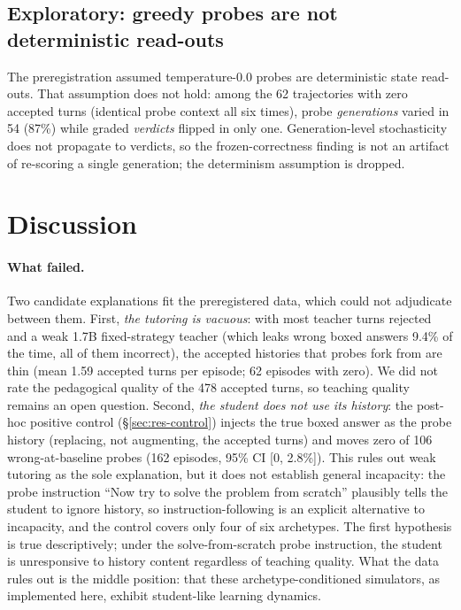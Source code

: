 \documentclass[notitlepage,12pt]{jedm}
\begin{document}
\subsection{Exploratory: greedy probes are not deterministic read-outs}
\label{sec:res-probe}

The preregistration assumed temperature-0.0 probes are deterministic state
read-outs. That assumption does not hold: among the 62 trajectories with
zero accepted turns (identical probe context all six times), probe
\emph{generations} varied in 54 (87\%) while graded \emph{verdicts}
flipped in only one. Generation-level stochasticity does not propagate to
verdicts, so the frozen-correctness finding is not an artifact of
re-scoring a single generation; the determinism assumption is dropped.

\section{Discussion}
\label{sec:discussion}

\paragraph{What failed.} Two candidate explanations fit the preregistered
data, which could not adjudicate between them. First, \emph{the tutoring
is vacuous}: with most teacher turns rejected and a weak 1.7B
fixed-strategy teacher (which leaks wrong boxed answers 9.4\% of the
time, all of them incorrect), the accepted histories that probes fork
from are thin (mean 1.59 accepted turns per episode; 62 episodes with
zero). We did not rate the pedagogical quality of the 478 accepted turns,
so teaching quality remains an open question. Second, \emph{the student
does not use its history}: the post-hoc positive control
(\S\ref{sec:res-control}) injects the true boxed answer as the probe
history (replacing, not augmenting, the accepted turns) and moves zero of
106 wrong-at-baseline probes (162 episodes, 95\% CI [0, 2.8\%]). This rules
out weak tutoring as the sole explanation, but it does not establish
general incapacity: the probe instruction ``Now try to solve the problem
from scratch'' plausibly tells the student to ignore history, so
instruction-following is an explicit alternative to incapacity, and the
control covers only four of six archetypes. The first hypothesis is true
descriptively; under the solve-from-scratch probe instruction, the student
is unresponsive to history content regardless of teaching quality. What the
data rules out is the middle position: that these archetype-conditioned
simulators, as implemented here, exhibit student-like learning dynamics.
\end{document}

